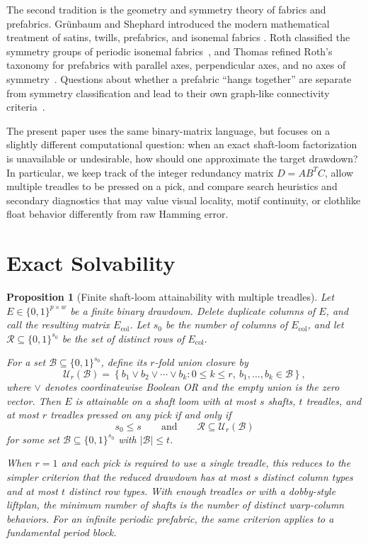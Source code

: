 \documentclass[11pt]{article}
\newtheorem{proposition}{Proposition}
\begin{document}
The second tradition is the geometry and symmetry theory of fabrics and
prefabrics. Gr\"unbaum and Shephard introduced the modern mathematical
treatment of satins, twills, prefabrics, and isonemal fabrics
\cite{grunbaum1980,grunbaum1985,grunbaum1986,grunbaum1988}. Roth classified the
symmetry groups of periodic isonemal fabrics~\cite{roth1993}, and Thomas
refined Roth's taxonomy for prefabrics with parallel axes, perpendicular axes,
and no axes of symmetry~\cite{thomas2009,thomas2010perp,thomas2010noaxes}.
Questions about whether a prefabric ``hangs together'' are separate from
symmetry classification and lead to their own graph-like connectivity
criteria~\cite{clapham1980,delaney1986,enns1984}.

The present paper uses the same binary-matrix language, but focuses on a slightly
different computational question: when an exact shaft-loom factorization is
unavailable or undesirable, how should one approximate the target drawdown? In
particular, we keep track of the integer redundancy matrix \(D=AB^TC\), allow
multiple treadles to be pressed on a pick, and compare search heuristics and
secondary diagnostics that may value visual locality, motif continuity, or
clothlike float behavior differently from raw Hamming error.

\section{Exact Solvability}

\begin{proposition}[Finite shaft-loom attainability with multiple treadles]
Let \(E\in\{0,1\}^{p\times w}\) be a finite binary drawdown. Delete duplicate
columns of \(E\), and call the resulting matrix \(E_{\mathrm{col}}\). Let
\(s_0\) be the number of columns of \(E_{\mathrm{col}}\), and let
\(\mathcal{R}\subseteq\{0,1\}^{s_0}\) be the set of distinct rows of
\(E_{\mathrm{col}}\).

For a set \(\mathcal{B}\subseteq\{0,1\}^{s_0}\), define its
\(r\)-fold union closure by
\[
  \mathcal{U}_r(\mathcal{B})
  =
  \left\{
    b_1\vee b_2\vee\cdots\vee b_k
    :
    0\le k\le r,\ b_1,\dots,b_k\in\mathcal{B}
  \right\},
\]
where \(\vee\) denotes coordinatewise Boolean OR and the empty union is the
zero vector. Then \(E\) is attainable on a shaft loom with at most \(s\) shafts,
\(t\) treadles, and at most \(r\) treadles pressed on any pick if and only if
\[
  s_0\le s
  \qquad\text{and}\qquad
  \mathcal{R}\subseteq \mathcal{U}_r(\mathcal{B})
\]
for some set \(\mathcal{B}\subseteq\{0,1\}^{s_0}\) with
\(|\mathcal{B}|\le t\).

When \(r=1\) and each pick is required to use a single treadle, this reduces to
the simpler criterion that the reduced drawdown has at most \(s\) distinct
column types and at most \(t\) distinct row types. With enough treadles or with a
dobby-style liftplan, the minimum number of shafts is the number of distinct
warp-column behaviors. For an infinite periodic prefabric, the same criterion
applies to a fundamental period block.
\end{proposition}
\end{document}
